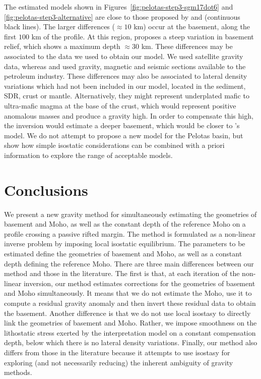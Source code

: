 \documentclass[manuscript,revised]{geophysics}
\begin{document}
The estimated models shown in Figures~\ref{fig:pelotas-step3-sgm17dot6} and 
\ref{fig:pelotas-step3-alternative} are close to those proposed by 
\citet{stica-etal2014} and \citet{zalan2015} (continuous black lines).
The larger differences ($\approx 10$ km) occur at the basement, along the first 
$100$ km of the profile.
At this region, \citeauthor{zalan2015} proposes a steep variation in basement
relief, which shows a maximum depth $\approx 30$ km.
These differences may be associated to the data we used to obtain our model.
We used satellite gravity data, whereas \citet{stica-etal2014} and \citet{zalan2015} used
gravity, magnetic and seismic sections available to the petroleum industry.
These differences may also be associated to lateral density variations which had 
not been included in our model, located in the sediment, SDR, crust or mantle. 
Alternatively, they might represent underplated mafic to ultra-mafic 
magma at the base of the crust, which would represent positive anomalous
masses and produce a gravity high. In order to compensate this high, the 
inversion would estimate a deeper basement, which would be closer to 
\citeauthor{zalan2015}'s model.
We do not attempt to propose a new model for the Pelotas basin, but show
how simple isostatic considerations can be combined with a priori information 
to explore the range of acceptable models.


\section{Conclusions}

We present a new gravity method for simultaneously estimating the 
geometries of basement and Moho, as well as the constant depth of the reference 
Moho on a profile crossing a passive rifted margin.
The method is formulated as a non-linear inverse problem by imposing local
isostatic equilibrium.
The parameters to be estimated define the geometries of basement and Moho, 
as well as a constant depth defining the reference Moho.
There are three main differences between our method and those in the literature.
The first is that, at each iteration of the non-linear inversion, 
our method estimates corrections for the geometries of basement and Moho simultaneously. 
It means that we do not estimate the Moho, use it to compute a residual gravity anomaly
and then invert these residual data to obtain the basement.
Another difference is that we do not use local isostasy to directly link
the geometries of basement and Moho.
Rather, we impose smoothness on the lithostatic stress exerted by the interpretation 
model on a constant compensation depth, below which there is no lateral density variations.
Finally, our method also differs from those in the literature because it 
attempts to use isostasy for exploring (and not necessarily reducing) the inherent ambiguity of 
gravity methods.
\end{document}
